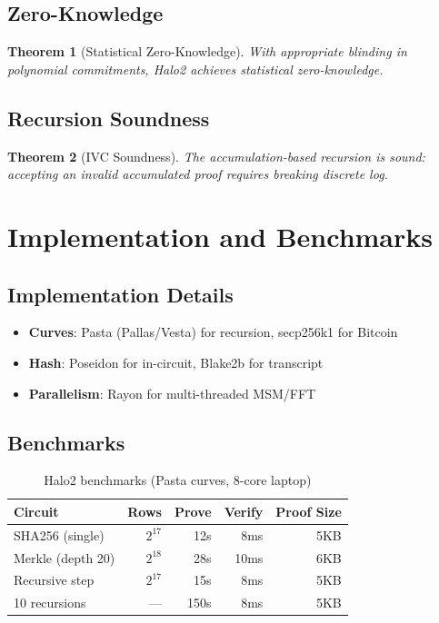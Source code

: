 \documentclass[11pt,a4paper]{article}
\newtheorem{theorem}{Theorem}[section]
\begin{document}
\subsection{Zero-Knowledge}

\begin{theorem}[Statistical Zero-Knowledge]
With appropriate blinding in polynomial commitments, Halo2 achieves statistical zero-knowledge.
\end{theorem}

\subsection{Recursion Soundness}

\begin{theorem}[IVC Soundness]
The accumulation-based recursion is sound: accepting an invalid accumulated proof requires breaking discrete log.
\end{theorem}

\section{Implementation and Benchmarks}
\label{sec:implementation}

\subsection{Implementation Details}

\begin{itemize}
    \item \textbf{Curves}: Pasta (Pallas/Vesta) for recursion, secp256k1 for Bitcoin
    \item \textbf{Hash}: Poseidon for in-circuit, Blake2b for transcript
    \item \textbf{Parallelism}: Rayon for multi-threaded MSM/FFT
\end{itemize}

\subsection{Benchmarks}

\begin{table}[h]
\centering
\begin{tabular}{lrrrr}
\toprule
\textbf{Circuit} & \textbf{Rows} & \textbf{Prove} & \textbf{Verify} & \textbf{Proof Size} \\
\midrule
SHA256 (single) & $2^{17}$ & 12s & 8ms & 5KB \\
Merkle (depth 20) & $2^{18}$ & 28s & 10ms & 6KB \\
Recursive step & $2^{17}$ & 15s & 8ms & 5KB \\
10 recursions & --- & 150s & 8ms & 5KB \\
\bottomrule
\end{tabular}
\caption{Halo2 benchmarks (Pasta curves, 8-core laptop)}
\label{tab:halo2-bench}
\end{table}
\end{document}
